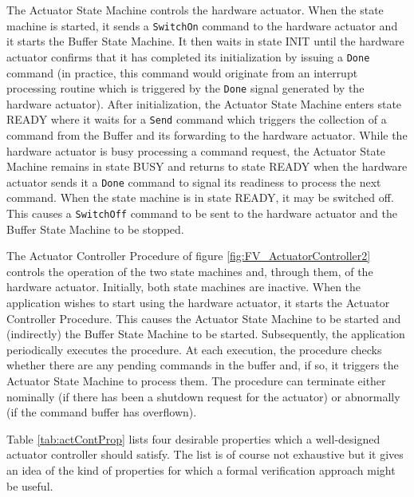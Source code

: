 \documentclass[definition]{../fwprofile}
\begin{document}
The Actuator State Machine controls the hardware actuator. When the state machine is started, it sends a \texttt{SwitchOn} command to the hardware actuator and it starts the Buffer State Machine. It then waits in state INIT until the hardware actuator confirms that it has completed its initialization by issuing a \texttt{Done} command (in practice, this command would originate from an interrupt processing routine which is triggered by the \texttt{Done} signal generated by the hardware actuator). After initialization, the Actuator State Machine enters state READY where it waits for a \texttt{Send} command which triggers the collection of a command from the Buffer and its forwarding to the hardware actuator. While the hardware actuator is busy processing a command request, the Actuator State Machine remains in state BUSY and returns to state READY when the hardware actuator sends it a \texttt{Done} command to signal its readiness to process the next command. When the state machine is in state READY, it may be switched off. This causes a \texttt{SwitchOff} command to be sent to the hardware actuator and the Buffer State Machine to be stopped.

The Actuator Controller Procedure of figure \ref{fig:FV_ActuatorController2} controls the operation of the two state machines and, through them, of the hardware actuator. Initially, both state machines are inactive. When the application wishes to start using the hardware actuator, it starts the Actuator Controller Procedure. This causes the Actuator State Machine to be started and (indirectly) the Buffer State Machine to be started. Subsequently, the application periodically executes the procedure. At each execution, the procedure checks whether there are any pending commands in the buffer and, if so, it triggers the Actuator State Machine to process them. The procedure can terminate either nominally (if there has been a shutdown request for the actuator) or abnormally (if the command buffer has overflown).  

Table \ref{tab:actContProp} lists four desirable properties which a well-designed actuator controller should satisfy. The list is of course not exhaustive but it gives an idea of the kind of properties for which a formal verification approach might be useful.  
\end{document}
